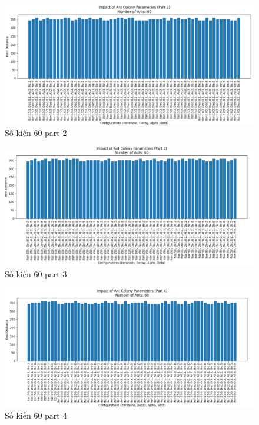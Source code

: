 \documentclass[14pt]{article}
\begin{document}
\begin{center}
		\begin{figure}[htbp]
			\centering
			\includegraphics[width=\textwidth]{./Image/60_part2.png}
			\caption{Số kiến 60 part 2}
			\label{fig:mylabel}
		\end{figure}
		
		\begin{figure}[htbp]
			\centering
			\includegraphics[width=\textwidth]{./Image/60_part3.png}
			\caption{Số kiến 60 part 3}
			\label{fig:mylabel}
		\end{figure}
		\begin{figure}[htbp]
			\centering
			\includegraphics[width=\textwidth]{./Image/60_part4.png}
			\caption{Số kiến 60 part 4}
			\label{fig:mylabel}
		\end{figure}
	\end{center}
	\newpage
\end{document}
